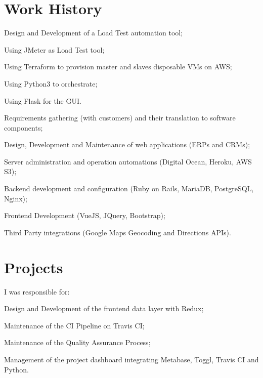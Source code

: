 \documentclass[]{deedy-resume-openfont}
\begin{document}
\begin{minipage}[t]{0.65\textwidth} 

\section{Work History}

\vspace{\topsep} %
\begin{tightemize}
	\item Design and Development of a Load Test automation tool;
	\item Using JMeter as Load Test tool;
	\item Using Terraform to provision master and slaves disposable VMs on AWS;
	\item Using Python3 to orchestrate;
	\item Using Flask for the GUI.
\end{tightemize}
\sectionsep

\begin{tightemize}
\item Requirements gathering (with customers) and their translation to software components;
\item Design, Development and Maintenance of web applications (ERPs and CRMs);
\item Server administration and operation automations (Digital Ocean, Heroku, AWS S3);
\item Backend development and configuration (Ruby on Rails, MariaDB, PostgreSQL, Nginx);
\item Frontend Development (VueJS, JQuery, Bootstrap);
\item Third Party integrations (Google Maps Geocoding and Directions APIs).
\end{tightemize}
\sectionsep


\section{Projects}
\vspace{\topsep} %
I was responsible for:
\begin{tightemize}
	\item Design and Development of the frontend data layer with Redux;
	\item Maintenance of the CI Pipeline on Travis CI;
	\item Maintenance of the Quality Assurance Process;
	\item Management of the project dashboard integrating Metabase, Toggl, Travis CI and Python.
\end{tightemize}
\sectionsep
\begin{comment}

\end{comment}
\end{minipage}
\end{document}
